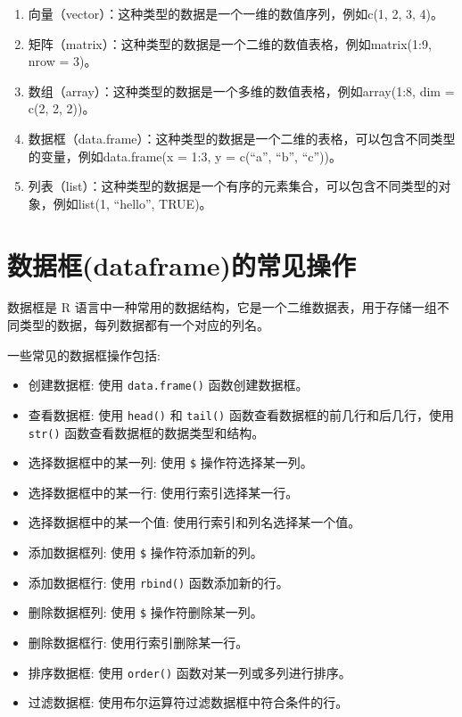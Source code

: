 \documentclass[
  letterpaper,
  DIV=11,
  numbers=noendperiod]{scrreprt}
\providecommand{\tightlist}{%
  \setlength{\itemsep}{0pt}\setlength{\parskip}{0pt}}\usepackage{longtable,booktabs,array}
\begin{document}
\begin{enumerate}
\def\labelenumi{\arabic{enumi}.}
\item
  向量（vector）：这种类型的数据是一个一维的数值序列，例如c(1, 2, 3,
  4)。
\item
  矩阵（matrix）：这种类型的数据是一个二维的数值表格，例如matrix(1:9,
  nrow = 3)。
\item
  数组（array）：这种类型的数据是一个多维的数值表格，例如array(1:8, dim
  = c(2, 2, 2))。
\item
  数据框（data.frame）：这种类型的数据是一个二维的表格，可以包含不同类型的变量，例如data.frame(x
  = 1:3, y = c(``a'', ``b'', ``c''))。
\item
  列表（list）：这种类型的数据是一个有序的元素集合，可以包含不同类型的对象，例如list(1,
  ``hello'', TRUE)。
\end{enumerate}

\hypertarget{ux6570ux636eux6846dataframeux7684ux5e38ux89c1ux64cdux4f5c}{%
\section{数据框(dataframe)的常见操作}\label{ux6570ux636eux6846dataframeux7684ux5e38ux89c1ux64cdux4f5c}}

数据框是 R
语言中一种常用的数据结构，它是一个二维数据表，用于存储一组不同类型的数据，每列数据都有一个对应的列名。

一些常见的数据框操作包括:

\begin{itemize}
\tightlist
\item
  创建数据框: 使用 \texttt{data.frame()} 函数创建数据框。
\item
  查看数据框: 使用 \texttt{head()} 和 \texttt{tail()}
  函数查看数据框的前几行和后几行，使用 \texttt{str()}
  函数查看数据框的数据类型和结构。
\item
  选择数据框中的某一列: 使用 \texttt{\$} 操作符选择某一列。
\item
  选择数据框中的某一行: 使用行索引选择某一行。
\item
  选择数据框中的某一个值: 使用行索引和列名选择某一个值。
\item
  添加数据框列: 使用 \texttt{\$} 操作符添加新的列。
\item
  添加数据框行: 使用 \texttt{rbind()} 函数添加新的行。
\item
  删除数据框列: 使用 \texttt{\$} 操作符删除某一列。
\item
  删除数据框行: 使用行索引删除某一行。
\item
  排序数据框: 使用 \texttt{order()} 函数对某一列或多列进行排序。
\item
  过滤数据框: 使用布尔运算符过滤数据框中符合条件的行。
\end{itemize}
\end{document}
